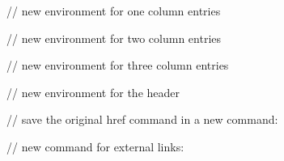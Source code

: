\documentclass[a4paper,9pt]{article}
\begin{document}
\newenvironment{onecolentry}{
    \begin{adjustwidth}{
        0.05 cm + 0.00001 cm
    }{
        0.05 cm + 0.00001 cm
    }
}{
    \end{adjustwidth}
} // new environment for one column entries

\newenvironment{twocolentry}[2][]{
    \onecolentry
    \def\secondColumn{#2}
    \begin{paracol}{2}
}{
    \switchcolumn \raggedleft \secondColumn
    \end{paracol}
    \endonecolentry
} // new environment for two column entries

\newenvironment{threecolentry}[3][]{
    \onecolentry
    \def\thirdColumn{#3}
    \setcolumnwidth{0.6 cm, \fill, 3.5 cm}
    \begin{paracol}{3}
    {\raggedright #2} \switchcolumn
}{
    \switchcolumn \raggedleft \thirdColumn
    \end{paracol}
    \endonecolentry
} // new environment for three column entries

\newenvironment{header}{
    \setlength{\topsep}{0pt}\par\kern\topsep\centering\color{primaryColor}\linespread{1.1}
}{
    \par\kern\topsep
} // new environment for the header

\newcommand{\placelastupdatedtext}{%
  \AddToShipoutPictureFG*{%
    \put(
        \LenToUnit{\paperwidth-1.2 cm-0.2 cm+0.05cm},
        \LenToUnit{\paperheight-0.6 cm}
    ){\vtop{{\null}\makebox[0pt][c]{
        \scriptsize\color{gray}\textit{Last updated in September 2024}\hspace{\widthof{Last updated in September 2024}}
    }}}%
  }%
}%

// save the original href command in a new command:
\let\hrefWithoutArrow\href

// new command for external links:
\renewcommand{\href}[2]{\hrefWithoutArrow{#1}{\ifthenelse{\equal{#2}{}}{ }{#2 }\raisebox{.1ex}{\scriptsize \faExternalLink*}}}
\end{document}
